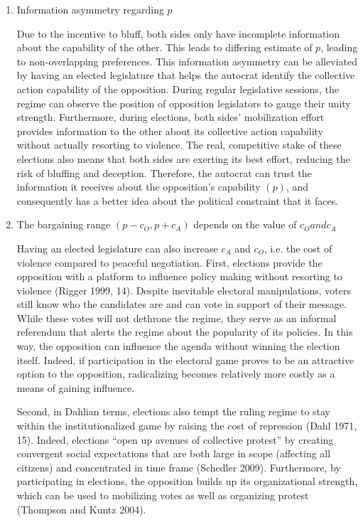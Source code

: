 \documentclass[12pt]{article}
\begin{document}
\begin{enumerate}
\item Information asymmetry regarding $p$

Due to the incentive to bluff, both sides only have incomplete information about the capability of the other. This leads to differing estimate of $p$, leading to non-overlapping preferences. This information asymmetry can be alleviated by having an elected legislature that helps the autocrat identify the collective action capability of the opposition. During regular legislative sessions, the regime can observe the position of opposition legislators to gauge their unity strength. Furthermore, during elections, both sides’ mobilization effort provides information to the other about its collective action capability without actually resorting to violence. The real, competitive stake of these elections also means that both sides are exerting its best effort, reducing the risk of bluffing and deception. Therefore, the autocrat can trust the information it receives about the opposition’s capability $(p)$, and consequently has a better idea about the political constraint that it faces.

\item The bargaining range $(p - c_O, p + c_A)$ depends on the value of $c_O and c_A$

Having an elected legislature can also increase $c_A$ and $c_O$, i.e. the cost of violence compared to peaceful negotiation. First, elections provide the opposition with a platform to influence policy making without resorting to violence (Rigger 1999, 14). Despite inevitable electoral manipulations, voters still know who the candidates are and can vote in support of their message. While these votes will not dethrone the regime, they serve as an informal referendum that alerts the regime about the popularity of its policies. In this way, the opposition can influence the agenda without winning the election itself. Indeed, if participation in the electoral game proves to be an attractive option to the opposition, radicalizing becomes relatively more costly as a means of gaining influence.

Second, in Dahlian terms, elections also tempt the ruling regime to stay within the institutionalized game by raising the cost of repression (Dahl 1971, 15). Indeed, elections “open up avenues of collective protest” by creating convergent social expectations that are both large in scope (affecting all citizens) and concentrated in time frame (Schedler 2009). Furthermore, by participating in elections, the opposition builds up its organizational strength, which can be used to mobilizing votes as well as organizing protest (Thompson and Kuntz 2004).


\end{enumerate}
\end{document}
